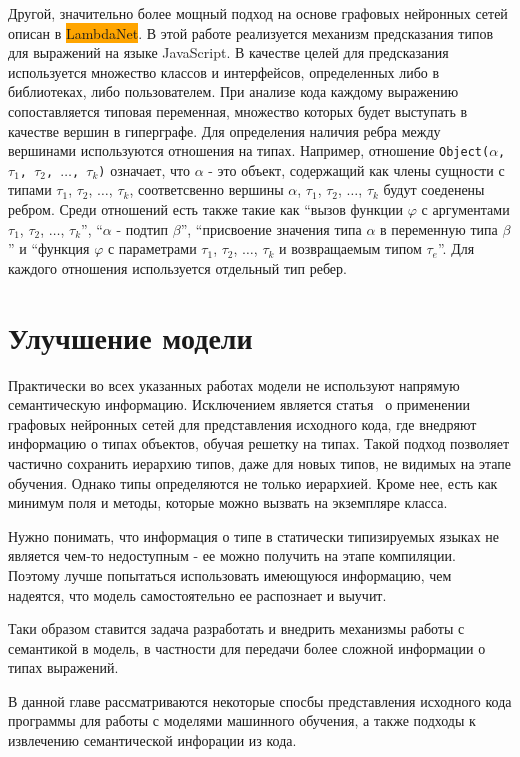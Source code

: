 \documentclass[times,specification,annotation]{itmo-student-thesis}
\begin{document}
Другой, значительно более мощный подход на основе графовых нейронных сетей описан в \colorbox{orange}{LambdaNet}. В этой работе реализуется механизм предсказания типов для выражений на языке JavaScript. В качестве целей для предсказания используется множество классов и интерфейсов, определенных либо в библиотеках, либо пользователем. При анализе кода каждому выражению сопоставляется типовая переменная, множество которых будет выступать в качестве вершин в гиперграфе. Для определения наличия ребра между вершинами используются отношения на типах. Например, отношение \texttt{Object($\alpha$, $\tau_1$, $\tau_2$, $\ldots$, $\tau_k$)} означает, что $\alpha$ - это объект, содержащий как члены сущности с типами $\tau_1$, $\tau_2$, $\ldots$, $\tau_k$, соответсвенно вершины $\alpha$, $\tau_1$, $\tau_2$, $\ldots$, $\tau_k$ будут соеденены ребром. Среди отношений есть также такие как ``вызов функции $\varphi$ с аргументами $\tau_1$, $\tau_2$, $\ldots$, $\tau_k$'', ``$\alpha$ - подтип $\beta$'', ``присвоение значения типа $\alpha$ в переменную типа $\beta$'' и ``функция $\varphi$ с параметрами $\tau_1$, $\tau_2$, $\ldots$, $\tau_k$ и возвращаемым типом $\tau_e$''. Для каждого отношения используется отдельный тип ребер.


\section{Улучшение модели}\label{sec:improve}
Практически во всех указанных работах модели не используют напрямую семантическую информацию. Исключением является статья~\cite{gated-graphs-nn} о применении графовых нейронных сетей для представления исходного кода, где внедряют информацию о типах объектов, обучая решетку на типах. Такой подход позволяет частично сохранить иерархию типов, даже для новых типов, не видимых на этапе обучения. Однако типы определяются не только иерархией. Кроме нее, есть как минимум поля и методы, которые можно вызвать на экземпляре класса.

Нужно понимать, что информация о типе в статически типизируемых языках не является чем-то недоступным - ее можно получить на этапе компиляции. Поэтому лучше попытаться использовать имеющуюся информацию, чем надеятся, что модель самостоятельно ее распознает и выучит.

Таки образом ставится задача разработать и внедрить механизмы работы с семантикой в модель, в частности для передачи более сложной информации о типах выражений.

\chapterconclusion
В данной главе рассматриваются некоторые спосбы представления исходного кода программы для работы с моделями машинного обучения, а также подходы к извлечению семантической инфорации из кода.
\end{document}
